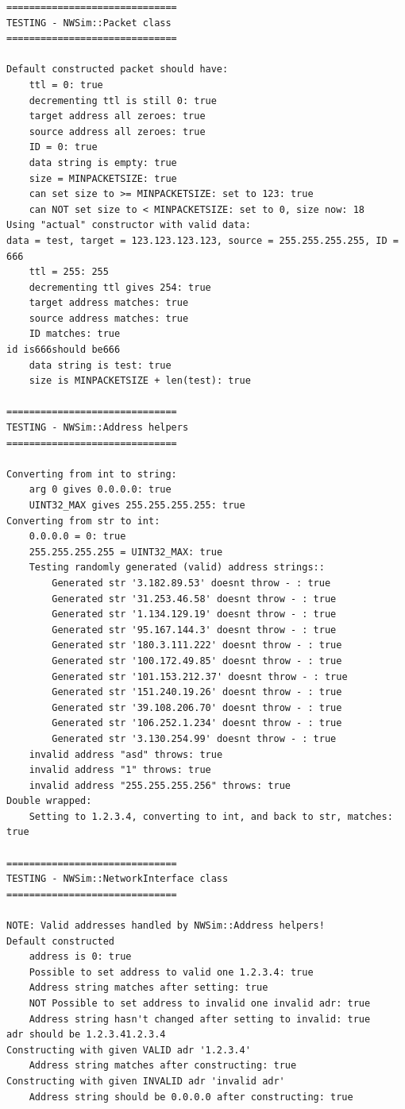 \lstset{basicstyle=\scriptsize}
\begin{lstlisting}
==============================
TESTING - NWSim::Packet class
==============================

Default constructed packet should have:
	ttl = 0: true
	decrementing ttl is still 0: true
	target address all zeroes: true
	source address all zeroes: true
	ID = 0: true
	data string is empty: true
	size = MINPACKETSIZE: true
	can set size to >= MINPACKETSIZE: set to 123: true
	can NOT set size to < MINPACKETSIZE: set to 0, size now: 18
Using "actual" constructor with valid data:
data = test, target = 123.123.123.123, source = 255.255.255.255, ID = 666
	ttl = 255: 255
	decrementing ttl gives 254: true
	target address matches: true
	source address matches: true
	ID matches: true
id is666should be666
	data string is test: true
	size is MINPACKETSIZE + len(test): true

==============================
TESTING - NWSim::Address helpers
==============================

Converting from int to string:
	arg 0 gives 0.0.0.0: true
	UINT32_MAX gives 255.255.255.255: true
Converting from str to int:
	0.0.0.0 = 0: true
	255.255.255.255 = UINT32_MAX: true
	Testing randomly generated (valid) address strings:: 
		Generated str '3.182.89.53' doesnt throw - : true
		Generated str '31.253.46.58' doesnt throw - : true
		Generated str '1.134.129.19' doesnt throw - : true
		Generated str '95.167.144.3' doesnt throw - : true
		Generated str '180.3.111.222' doesnt throw - : true
		Generated str '100.172.49.85' doesnt throw - : true
		Generated str '101.153.212.37' doesnt throw - : true
		Generated str '151.240.19.26' doesnt throw - : true
		Generated str '39.108.206.70' doesnt throw - : true
		Generated str '106.252.1.234' doesnt throw - : true
		Generated str '3.130.254.99' doesnt throw - : true
	invalid address "asd" throws: true
	invalid address "1" throws: true
	invalid address "255.255.255.256" throws: true
Double wrapped:
	Setting to 1.2.3.4, converting to int, and back to str, matches: true

==============================
TESTING - NWSim::NetworkInterface class
==============================

NOTE: Valid addresses handled by NWSim::Address helpers!
Default constructed
	address is 0: true
	Possible to set address to valid one 1.2.3.4: true
	Address string matches after setting: true
	NOT Possible to set address to invalid one invalid adr: true
	Address string hasn't changed after setting to invalid: true
adr should be 1.2.3.41.2.3.4
Constructing with given VALID adr '1.2.3.4'
	Address string matches after constructing: true
Constructing with given INVALID adr 'invalid adr'
	Address string should be 0.0.0.0 after constructing: true


\end{lstlisting}
